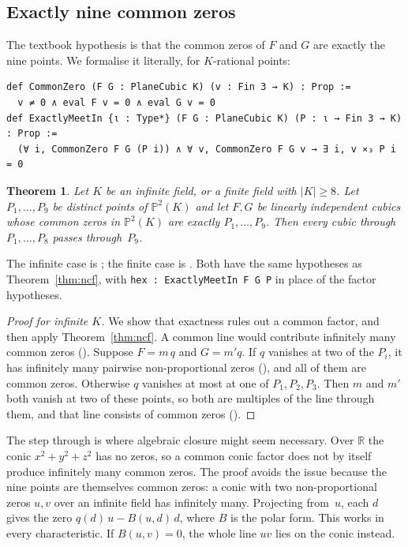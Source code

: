 \documentclass[11pt]{article}
\newtheorem{theorem}{Theorem}
\theoremstyle{definition}
\theoremstyle{remark}
\newcommand{\lean}[1]{\texttt{#1}}
\newcommand{\PP}{\mathbb{P}}
\begin{document}
\subsection{Exactly nine common zeros}

The textbook hypothesis is that the common zeros of $F$ and $G$ are exactly the nine points. We
formalise it literally, for $K$-rational points:
\begin{lstlisting}
def CommonZero (F G : PlaneCubic K) (v : Fin 3 → K) : Prop :=
  v ≠ 0 ∧ eval F v = 0 ∧ eval G v = 0
def ExactlyMeetIn {ι : Type*} (F G : PlaneCubic K) (P : ι → Fin 3 → K) : Prop :=
  (∀ i, CommonZero F G (P i)) ∧ ∀ v, CommonZero F G v → ∃ i, v ⨯₃ P i = 0
\end{lstlisting}

\begin{theorem}\label{thm:classical}
Let $K$ be an infinite field, or a finite field with $|K|\ge8$. Let $P_1,\dots,P_9$ be distinct
points of $\PP^2(K)$ and let $F,G$ be linearly independent cubics whose common zeros in
$\PP^2(K)$ are exactly $P_1,\dots,P_9$. Then every cubic through $P_1,\dots,P_8$ passes
through~$P_9$.
\end{theorem}

The infinite case is ; the finite case is
. Both have the same hypotheses as
Theorem~\ref{thm:ncf}, with \lean{hex : ExactlyMeetIn F G P} in place of the factor hypotheses.

\begin{proof}[Proof for infinite $K$]
We show that exactness rules out a common factor, and then apply Theorem~\ref{thm:ncf}. A common
line would contribute infinitely many common zeros (). Suppose
$F=m\,q$ and $G=m'q$. If $q$ vanishes at two of the $P_i$, it has infinitely many pairwise
non-proportional zeros (), and all of them are common zeros. Otherwise $q$
vanishes at most at one of $P_1,P_2,P_3$. Then $m$ and $m'$ both vanish at two of these points,
so both are multiples of the line through them, and that line consists of common zeros
().
\end{proof}

The step through  is where algebraic closure might seem necessary. Over
$\mathbb{R}$ the conic $x^2+y^2+z^2$ has no zeros, so a common conic factor does not by itself
produce infinitely many common zeros. The proof avoids the issue because the nine points are
themselves common zeros: a conic with two non-proportional zeros $u,v$ over an infinite field has
infinitely many. Projecting from~$u$, each $d$ gives the zero $q(d)\,u-B(u,d)\,d$, where $B$ is
the polar form. This works in every characteristic. If $B(u,v)=0$, the whole line $uv$ lies on
the conic instead.
\end{document}

